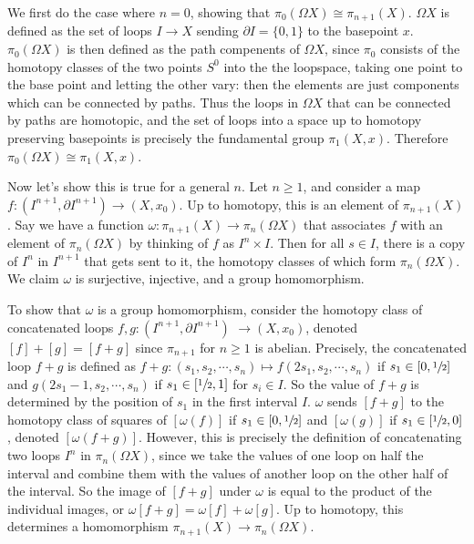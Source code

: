 \begin{solution}
    We first do the case where $n=0$, showing that $\pi_0(\Omega X) \cong\pi_{n+1}(X)$. $\Omega X$ is defined as the set of loops $I\to X$ sending $\partial I=\{0,1\} $ to the basepoint $x$. $\pi_0(\Omega X)$ is then defined as the path compenents of $\Omega X$, since $\pi_0$ consists of the homotopy classes of the two points $S^0$ into the the loopspace, taking one point to the base point and letting the other vary: then the elements are just components which can be connected by paths. Thus the loops in $\Omega X$ that can be connected by paths are homotopic, and the set of loops into a space up to homotopy preserving basepoints is precisely the fundamental group $\pi_1(X,x)$. Therefore $\pi_0(\Omega X) \cong \pi_1(X,x)$.

    Now let's show this is true for a general $n$. Let $n\geq 1$, and consider a map $f \colon (I^{n+1}, \partial  I^{n+1}) \to (X,x_0)$. Up to homotopy, this is an element of $\pi_{n+1}(X)$. Say we have a function $\omega \colon \pi_{n+1}(X) \to \pi_n (\Omega X)$ that associates $f$ with an element of $\pi_n (\Omega X)$ by thinking of $f$ as $I^n  \times I$. Then for all $s\in I$, there is a copy of $I^n $ in $I^{n+1}$ that gets sent to it, the homotopy classes of which form $\pi_n (\Omega X)$. We claim $\omega$ is surjective, injective, and a group homomorphism.

    To show that $\omega$ is a group homomorphism, consider the homotopy class of concatenated loops $f,g \colon (I^{n+1},\partial I^{n+1}) $ $\to (X, x_0) $, denoted $[f]+[g]=[f+g]$ since $\pi_{n+1}$ for $n\geq 1$ is abelian. Precisely, the concatenated loop $f+g$ is defined as $f+g \colon (s_1,s_2,\cdots ,s_n  ) \mapsto f(2s_1,s_2,\cdots ,s_n  )$ if $s_1\in [0,\sfrac{1}{2}]$ and $g(2s_1-1,s_2,\cdots ,s_n  )$ if $s_1 \in [\sfrac{1}{2}, 1]$ for $s _i \in I$. So the value of $f+g$ is determined by the position of $s_1$ in the first interval $I$. $\omega$ sends $[f+g]$ to the homotopy class of squares of $[\omega (f)]$ if $s_1\in [0,\sfrac{1}{2}]$ and $[\omega (g)]$ if $s_1\in [\sfrac{1}{2}, 0]$, denoted $[\omega(f+g)]$. However, this is precisely the definition of concatenating two loops $I^n $ in $\pi_n (\Omega X)$, since we take the values of one loop on half the interval and combine them with the values of another loop on the other half of the interval. So the image of $[f+g]$ under $\omega$ is equal to the product of the individual images, or $\omega[f+g]=\omega[f]+\omega[g]$. Up to homotopy, this determines a homomorphism $\pi_{n+1}(X)\to \pi_n (\Omega X)$.


\end{solution}
